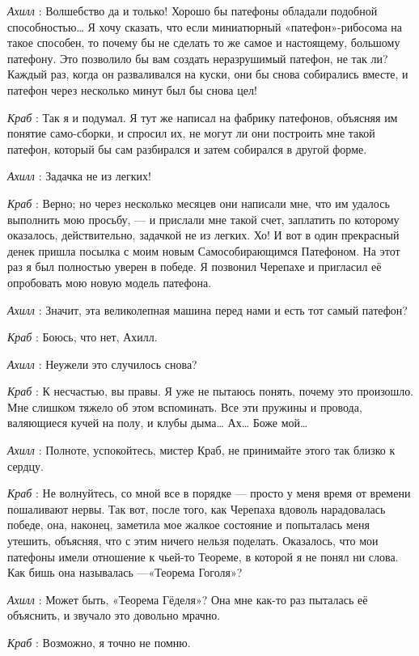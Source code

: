 \documentclass[../main.tex]{subfiles}
\begin{document}
\begin{dialogue}
\emph{Ахилл} : Волшебство да и только! Хорошо бы патефоны обладали подобной способностью\ldots{} Я хочу сказать, что если миниатюрный «патефон»-рибосома на такое способен, то почему бы не сделать то же самое и настоящему, большому патефону. Это позволило бы вам создать неразрушимый патефон, не так ли? Каждый раз, когда он разваливался на куски, они бы снова собирались вместе, и патефон через несколько минут был бы снова цел!

\emph{Краб} : Так я и подумал. Я тут же написал на фабрику патефонов, объясняя им понятие само-сборки, и спросил их, не могут ли они построить мне такой патефон, который бы сам разбирался и затем собирался в другой форме.

\emph{Ахилл} : Задачка не из легких!

\emph{Краб} : Верно; но через несколько месяцев они написали мне, что им удалось выполнить мою просьбу, --- и прислали мне такой счет, заплатить по которому оказалось, действительно, задачкой не из легких. Хо! И вот в один прекрасный денек пришла посылка с моим новым Самособирающимся Патефоном. На этот раз я был полностью уверен в победе. Я позвонил Черепахе и пригласил её опробовать мою новую модель патефона.

\emph{Ахилл} : Значит, эта великолепная машина перед нами и есть тот самый патефон?

\emph{Краб} : Боюсь, что нет, Ахилл.

\emph{Ахилл} : Неужели это случилось снова?

\emph{Краб} : К несчастью, вы правы. Я уже не пытаюсь понять, почему это произошло. Мне слишком тяжело об этом вспоминать. Все эти пружины и провода, валяющиеся кучей на полу, и клубы дыма\ldots{} Ах\ldots{} Боже мой\ldots{}

\emph{Ахилл} : Полноте, успокойтесь, мистер Краб, не принимайте этого так близко к сердцу.

\emph{Краб} : Не волнуйтесь, со мной все в порядке --- просто у меня время от времени пошаливают нервы. Так вот, после того, как Черепаха вдоволь нарадовалась победе, она, наконец, заметила мое жалкое состояние и попыталась меня утешить, объясняя, что с этим ничего нельзя поделать. Оказалось, что мои патефоны имели отношение к чьей-то Теореме, в которой я не понял ни слова. Как бишь она называлась ---«Теорема Гоголя»?

\emph{Ахилл} : Может быть, «Теорема Гёделя»? Она мне как-то раз пыталась её объяснить, и звучало это довольно мрачно.

\emph{Краб} : Возможно, я точно не помню.


\end{dialogue}
\end{document}
